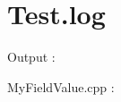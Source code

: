 \hypertarget{Test_8log-example}{}\section{Test.\+log}
Output \+: 
\begin{DoxyCode}{0}
\end{DoxyCode}
 My\+Field\+Value.\+cpp \+:


\begin{DoxyCodeInclude}{0}
\end{DoxyCodeInclude}
 